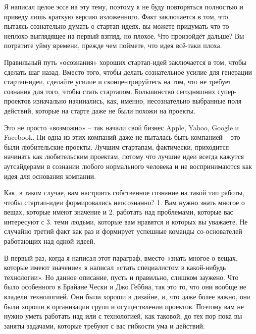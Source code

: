\documentclass[ebook,12pt,oneside,openany]{memoir}
\begin{document}
Я написал целое эссе на эту тему, поэтому я не буду повторяться
полностью и приведу лишь краткую версию изложенного. Факт заключается
в том, что пытаясь сознательно думать о стартап-идеях, вы можете
придумать что-то неплохо выглядящее на первый взгляд, но плохое. Что
произойдёт дальше? Вы потратите уйму времени, прежде чем поймете, что
идея всё-таки плоха. \newline

Правильный путь «осознания» хороших стартап-идей заключается в том,
чтобы сделать шаг назад. Вместо того, чтобы делать сознательное усилие
для генерации стартап-идеи, сделайте усилие и сконцентрируйтесь на
том, что не требует сознания для того, чтобы стать стартапом.
Большинство сегодняшних супер-проектов изначально начинались, как,
именно, несознательно выбранные поля действий, которые на старте даже
не были похожи на проекты. \newline

Это не просто «возможно» – так начали свой бизнес Apple, Yahoo, Google
и Facebook. Ни одна из этих компаний даже не пыталась быть компанией –
это были любительские проекты. Лучшим стартапам, фактически,
приходится начинать как любительским проектам, потому что лучшие идеи
всегда кажутся аутсайдерами в сознании любого нормального человека и
не воспринимаются как идея для основания компании. \newline

Как, в таком случае, вам настроить собственное сознание на такой тип
работы, чтобы стартап-идеи формировались неосознанно? 1. Вам нужно
знать многое о вещах, которые имеют значение и 2. работать над
проблемами, которые вас интересуют с 3. теми людьми, которые вам
нравятся и которых вы уважаете. Не случайно третий факт как раз и
формирует успешные команды со-основателей работающих над одной идеей. \newline

В первый раз, когда я написал этот параграф, вместо «знать многое о
вещах, которые имеют значение» я написал «стать специалистом в
какой-нибудь технологии». Но данное описание, пусть и правильно,
слишком заужено. Что было особенного в Брайане Чески и Джо Геббиа, так
это то, что они вообще не владели технологией. Они были хороши в
дизайне, и, что даже более важно, они были хороши в организации групп
и осуществлении проектов. Поэтому вам не нужно уметь работать над или
с технологией, как таковой, до тех пор пока вы заняты задачами,
которые требуют с вас гибкости ума и действий. \newline
\end{document}
